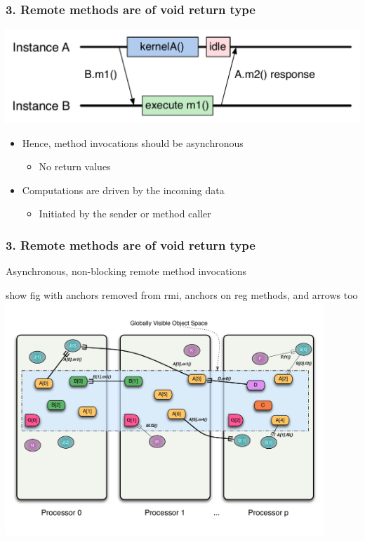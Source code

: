 \begin{frame}
\frametitle{3. Remote methods are of void return type}
  \begin{center}
    \includegraphics[width=\textwidth]{../figures/objectSequenceAsync.pdf}
  \end{center}
  \begin{itemize}
  \item Hence, method invocations should be asynchronous
    \begin{itemize}
    \item No return values
    \end{itemize}
  \item Computations are driven by the incoming data
    \begin{itemize}
    \item Initiated by the sender or method caller
    \end{itemize}
  \end{itemize}
\end{frame}


\begin{frame}
\frametitle{3. Remote methods are of void return type}
	Asynchronous, non-blocking remote method invocations
	\pause
	\begin{center}
        show fig with anchors removed from rmi, anchors on reg methods, and arrows too
        \includegraphics[width=0.9\textwidth]{../figures/progmodel/11-global-methods.pdf}
	\end{center}
\end{frame}



